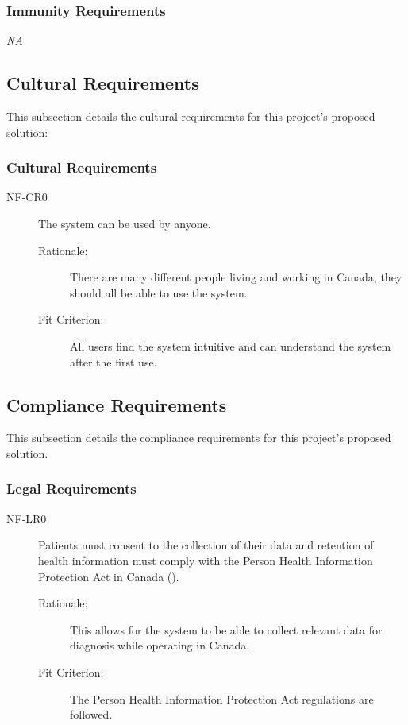 \documentclass[12pt]{article}
\begin{document}
\subsubsection{Immunity Requirements}
\textit{NA}


\subsection{Cultural Requirements}
This subsection details the cultural requirements for this project's proposed solution:

\subsubsection{Cultural Requirements}
\begin{description}
    \item[NF-CR0] The system can be used by anyone.
        \begin{description}
        \item[Rationale:] There are many different people living and working in Canada, they should all be able to use the system. 
        \item[Fit Criterion:] All users find the system intuitive and can understand the system after the first use. 
    \end{description}
\end{description}

\subsection{Compliance Requirements}
This subsection details the compliance requirements for this project's proposed solution.

\subsubsection{Legal Requirements}
\begin{description}
    \item[NF-LR0] Patients must consent to the collection of their data and retention of health information must comply with the Person Health Information Protection Act in Canada (\cite{PHIPA}). 
        \begin{description}
        \item[Rationale:] This allows for the system to be able to collect relevant data for diagnosis while operating in Canada. 
        \item[Fit Criterion:] The Person Health Information Protection Act regulations are followed. 
    \end{description}
\end{description}
\end{document}
